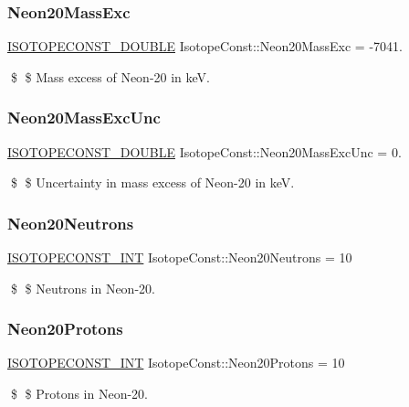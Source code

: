 \subsubsection{\texorpdfstring{Neon20\+Mass\+Exc}{Neon20MassExc}}
{\footnotesize\ttfamily \mbox{\hyperlink{group___isotope_const-_macros_ga8f45a7272ce02c0b4c65c44636ed719a}{I\+S\+O\+T\+O\+P\+E\+C\+O\+N\+S\+T\+\_\+\+D\+O\+U\+B\+LE}} Isotope\+Const\+::\+Neon20\+Mass\+Exc = -\/7041.}

\$ \$ Mass excess of Neon-\/20 in keV. \mbox{\label{group___isotope_const-_neon-_ne20_ga83af706f9606e3bd419668f5e54b6671}} 
\subsubsection{\texorpdfstring{Neon20\+Mass\+Exc\+Unc}{Neon20MassExcUnc}}
{\footnotesize\ttfamily \mbox{\hyperlink{group___isotope_const-_macros_ga8f45a7272ce02c0b4c65c44636ed719a}{I\+S\+O\+T\+O\+P\+E\+C\+O\+N\+S\+T\+\_\+\+D\+O\+U\+B\+LE}} Isotope\+Const\+::\+Neon20\+Mass\+Exc\+Unc = 0.}

\$ \$ Uncertainty in mass excess of Neon-\/20 in keV. \mbox{\label{group___isotope_const-_neon-_ne20_ga61e7a6967aa0ece391f0462d0d5a9caa}} 
\subsubsection{\texorpdfstring{Neon20\+Neutrons}{Neon20Neutrons}}
{\footnotesize\ttfamily \mbox{\hyperlink{group___isotope_const-_macros_ga5f18360b3e99483a35c32d789e62621c}{I\+S\+O\+T\+O\+P\+E\+C\+O\+N\+S\+T\+\_\+\+I\+NT}} Isotope\+Const\+::\+Neon20\+Neutrons = 10}

\$ \$ Neutrons in Neon-\/20. \mbox{\label{group___isotope_const-_neon-_ne20_ga158706cad3867afccea21970c311e37b}} 
\subsubsection{\texorpdfstring{Neon20\+Protons}{Neon20Protons}}
{\footnotesize\ttfamily \mbox{\hyperlink{group___isotope_const-_macros_ga5f18360b3e99483a35c32d789e62621c}{I\+S\+O\+T\+O\+P\+E\+C\+O\+N\+S\+T\+\_\+\+I\+NT}} Isotope\+Const\+::\+Neon20\+Protons = 10}

\$ \$ Protons in Neon-\/20. 